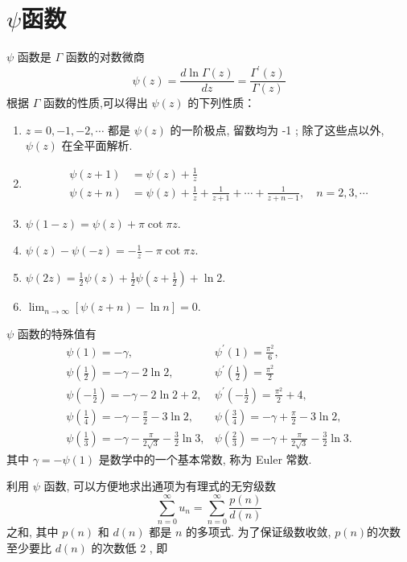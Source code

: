 \section{$\psi$函数}
$\psi$ 函数是 $\Gamma$ 函数的对数微商
\begin{equation}
    \psi(z)=\frac{d \ln \Gamma(z)}{d z}=\frac{\Gamma^{\prime}(z)}{\Gamma(z)}
\end{equation}
根据 $\Gamma$ 函数的性质,可以得出 $\psi(z)$ 的下列性质：

\begin{enumerate}
    \item $z=0,-1,-2, \cdots$ 都是 $\psi(z)$ 的一阶极点, 留数均为 -1 ; 除了这些点以外, $\psi(z)$ 在全平面解析.
    \item $$
    \begin{aligned}
    \psi(z+1) & =\psi(z)+\frac{1}{z} \\
    \psi(z+n) & =\psi(z)+\frac{1}{z}+\frac{1}{z+1}+\cdots+\frac{1}{z+n-1}, \quad n=2,3, \cdots
    \end{aligned}
    $$
    \item   $\psi(1-z)=\psi(z)+\pi \cot \pi z$.
    \item  $\psi(z)-\psi(-z)=-\frac{1}{z}-\pi \cot \pi z$.
    \item  $\psi(2 z)=\frac{1}{2} \psi(z)+\frac{1}{2} \psi\left(z+\frac{1}{2}\right)+\ln 2$.
    \item  $\lim _{n \rightarrow \infty}[\psi(z+n)-\ln n]=0$.
\end{enumerate}

$\psi$ 函数的特殊值有
$$
\begin{array}{ll}
\psi(1)=-\gamma, & \psi^{\prime}(1)=\frac{\pi^{2}}{6}, \\
\psi\left(\frac{1}{2}\right)=-\gamma-2 \ln 2, & \psi^{\prime}\left(\frac{1}{2}\right)=\frac{\pi^{2}}{2} \\
\psi\left(-\frac{1}{2}\right)=-\gamma-2 \ln 2+2, & \psi^{\prime}\left(-\frac{1}{2}\right)=\frac{\pi^{2}}{2}+4, \\
\psi\left(\frac{1}{4}\right)=-\gamma-\frac{\pi}{2}-3 \ln 2, & \psi\left(\frac{3}{4}\right)=-\gamma+\frac{\pi}{2}-3 \ln 2, \\
\psi\left(\frac{1}{3}\right)=-\gamma-\frac{\pi}{2 \sqrt{3}}-\frac{3}{2} \ln 3, & \psi\left(\frac{2}{3}\right)=-\gamma+\frac{\pi}{2 \sqrt{3}}-\frac{3}{2} \ln 3 .
\end{array}
$$
其中 $\gamma=-\psi(1)$ 是数学中的一个基本常数, 称为 Euler 常数.


利用 $\psi$ 函数, 可以方便地求出通项为有理式的无穷级数
$$
\sum_{n=0}^{\infty} u_{n}=\sum_{n=0}^{\infty} \frac{p(n)}{d(n)}
$$
之和, 其中 $p(n)$ 和 $d(n)$ 都是 $n$ 的多项式. 为了保证级数收敛, $p(n)$的次数至少要比 $d(n)$ 的次数低 2 , 即

